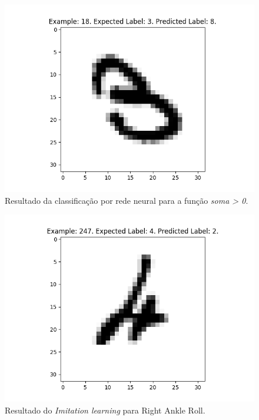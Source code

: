\documentclass[conference]{IEEEtran}
\begin{document}
\begin{figure}[htbp]
\centering
\centerline{\includegraphics[scale=0.5]{imagens/misclassified_image_18.png}}
\caption{Resultado da classificação por rede neural para a função \textit{soma > 0}.}
\label{misclassified_image_18}
\end{figure} 

\begin{figure}[htbp]
\centering
\centerline{\includegraphics[scale=0.5]{imagens/misclassified_image_247.png}}
\caption{Resultado do \textit{Imitation learning} para Right Ankle Roll.}
\label{misclassified_image_247}
\end{figure}
\end{document}
